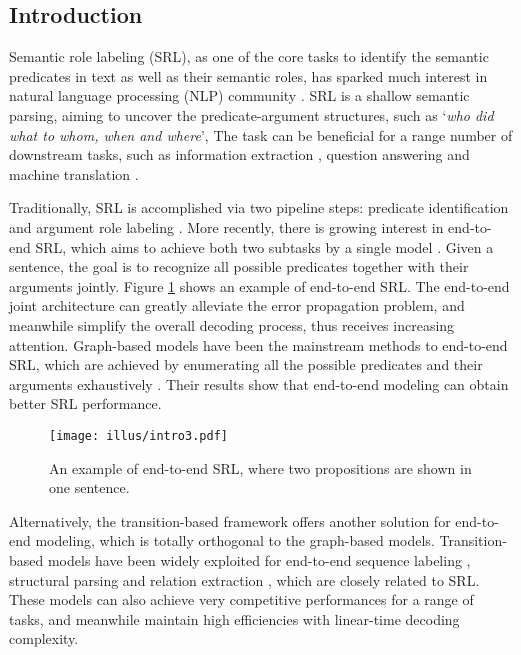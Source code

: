 \documentclass[letterpaper]{article} %
\begin{document}
\begin{CJK}{UTF8}{gbsn}
\section{Introduction}

Semantic role labeling (SRL), as one of the core tasks to identify the semantic predicates in text as well as their semantic roles,
has sparked much interest in natural language processing (NLP) community \cite{pradhan-etal-2005-semantic,lei-etal-2015-high,XiaL0ZFWS19}.
SRL is a shallow semantic parsing, aiming to uncover the predicate-argument structures, such as `\emph{who did what to whom, when and where}',
The task can be beneficial for a range number of downstream tasks, such as information extraction \cite{ChristensenMSE11,bastianelli-etal-2013-textual}, question answering \cite{shen-lapata-2007-using,berant-etal-2013-semantic} and machine translation \cite{xiong-etal-2012-modeling,shi-etal-2016-knowledge}.



Traditionally, SRL is accomplished via two pipeline steps: predicate identification \cite{SCHEIBLE10} and argument role labeling \cite{pradhan-etal-2005-semantic}.
More recently, there is growing interest in end-to-end SRL,
which aims to achieve both two subtasks by a single model \cite{he-etal-2018-jointly}.
Given a sentence, the goal is to recognize all possible predicates
together with their arguments jointly.
Figure \ref{intro} shows an example of end-to-end SRL.
The end-to-end joint architecture can greatly alleviate the error propagation problem,
and meanwhile simplify the overall decoding process,
thus receives increasing attention.
Graph-based models have been the mainstream methods to end-to-end SRL,
which are achieved by enumerating all the possible predicates and their arguments  exhaustively \cite{he-etal-2018-jointly,cai-etal-2018-full,LiHZZZZZ19}.
Their results show that end-to-end modeling can obtain better SRL performance.








\begin{figure}[!t]
\centering \texttt{[image: illus/intro3.pdf]}
\caption{
An example of end-to-end SRL, where two propositions are shown in one sentence.
}
\label{intro}
\end{figure}





Alternatively, the transition-based framework offers another solution for end-to-end modeling,
which is totally orthogonal to the graph-based models.
Transition-based models have been widely exploited for end-to-end sequence labeling \cite{zhang-clark-2010-fast,LyuZJ16,ZhangZF18},
structural parsing \cite{zhou-etal-2015-neural,dyer-etal-2015-transition,YuanJT19} and relation extraction \cite{wang-etal-2018-neural-transition,ZhangQZLJ19},
which are closely related to SRL.
These models can also achieve very competitive performances for a range of tasks,
and meanwhile maintain high efficiencies with linear-time decoding complexity.






\end{CJK}
\end{document}
